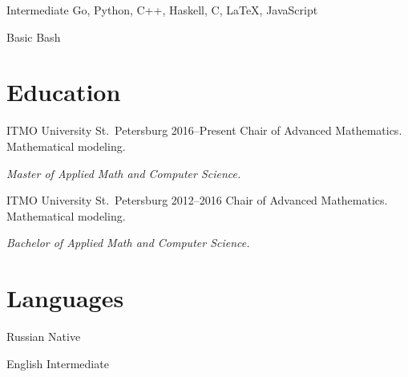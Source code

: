 \documentclass{cv}
\begin{document}
\begin{cvblock}{Intermediate}
  Go, Python, C++, Haskell, C, \LaTeX, JavaScript
\end{cvblock}

\begin{cvblock}{Basic}
  Bash
\end{cvblock}

\section{Education}

\begin{cvblock}{%
  \blocktitle
    {ITMO University}
    {St.~Petersburg}
    {}
    {2016--Present}}
  Chair of Advanced Mathematics. Mathematical modeling.
  \vspace{1em}

  \textit{Master of Applied Math and Computer Science.}
\end{cvblock}

\begin{cvblock}{%
  \blocktitle
    {ITMO University}
    {St.~Petersburg}
    {}
    {2012--2016}}
  Chair of Advanced Mathematics. Mathematical modeling.
  \vspace{1em}

  \textit{Bachelor of Applied Math and Computer Science.}
\end{cvblock}

\section{Languages}

\begin{cvblock}{Russian}
  Native
\end{cvblock}

\begin{cvblock}{English}
  Intermediate
\end{cvblock}
\end{document}
